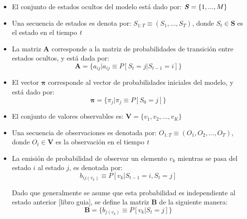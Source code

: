 \begin{itemize}

\item El conjunto de estados ocultos del modelo está dado por: $\textbf{\textit{S}} = \lbrace 1,...,M \rbrace$

\item Una secuencia de estados es denota por: $S_{1:T} \equiv ( S_{1},...,S_{T} )$, donde $S_{t} \in \textbf{S}$ es el estado en el tiempo \textit{t}

\item La matriz \textbf{A} corresponde a la matriz de probabilidades de transición entre estados ocultos, y está dada por:
  \begin{equation}
    \textbf{A} = \lbrace a_{ij} \vert a_{ij} \equiv P \left[S_{t} = j \vert S_{t-1} = i \right] \rbrace
  \end{equation}

\item El vector $\boldsymbol\pi$ corresponde al vector de probabilidades iniciales del modelo, y está dado por: 
  \begin{equation}
    \boldsymbol\pi = \lbrace \pi_{j} \vert \pi_{j} \equiv P \left[S_{0} = j \right] \rbrace
  \end{equation}

\item El conjunto de valores observables es: $\textbf{V} = \lbrace v_{1}, v_{2},...,v_{K} \rbrace$

\item Una secuencia de observaciones es denotada por: $O_{1:T} \equiv ( O_{1}, O_{2}, ..., O_{T} )$, donde $O_{t} \in \textbf{V}$ es la observación en el tiempo \textit{t}

\item La emisión de probabilidad de observar un elemento $v_{k}$ mientras se pasa del estado $i$ al estado $j$, es denotada por:
  \begin{equation}
    b_{ij(v_{k})} \equiv P \left[ v_{k} \vert S_{t-1} = i, S_{t} = j \right]
  \end{equation}

Dado que generalmente se asume que esta probabilidad es independiente al estado anterior [libro guia], se define la matriz \textbf{B} de la siguiente manera:
  \begin{equation}
    \textbf{B} = \lbrace b_{j(v_{k})} \equiv P\left[ v_{k} \vert S_{t} = j\right] \rbrace
  \end{equation}
  
\end{itemize}


